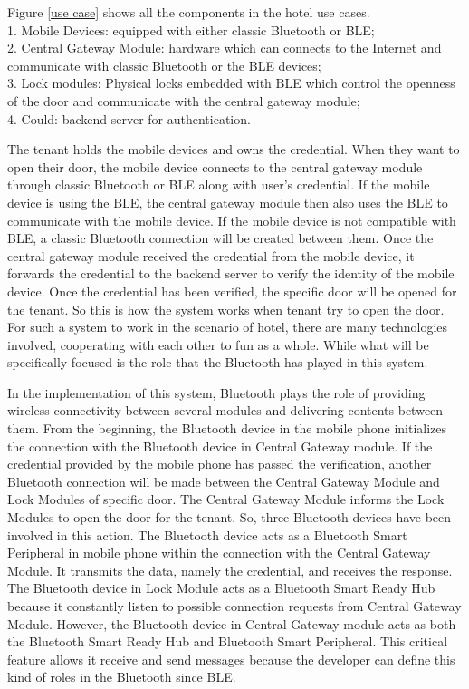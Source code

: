 \documentclass{cseminar}
\begin{document}
Figure \ref{use case} shows all the components in the hotel use cases.
\\1. Mobile Devices: equipped with either classic Bluetooth or BLE;
\\2. Central Gateway Module: hardware which can connects to the Internet and communicate with classic Bluetooth or the BLE devices;
\\3. Lock modules: Physical locks embedded with BLE which control the openness of the door and communicate with the central gateway module;
\\4. Could: backend server for authentication.

The tenant holds the mobile devices and owns the credential. When they want to open their door, the mobile device connects to the central gateway module through classic Bluetooth or BLE along with user's credential. If the mobile device is using the BLE, the central gateway module then also uses the BLE to communicate with the mobile device. If the mobile device is not compatible with BLE, a classic Bluetooth connection will be created between them. Once the central gateway module received the credential from the mobile device, it forwards the credential to the backend server to verify the identity of the mobile device. Once the credential has been verified, the specific door will be opened for the tenant. So this is how the system works when tenant try to open the door. For such a system to work in the scenario of hotel, there are many technologies involved, cooperating with each other to fun as a whole. While what will be specifically focused is the role that the Bluetooth has played in this system.

In the implementation of this system, Bluetooth plays the role of providing wireless connectivity between several modules and delivering contents between them. From the beginning, the Bluetooth device in the mobile phone initializes the connection with the Bluetooth device in Central Gateway module. If the credential provided by the mobile phone has passed the verification, another Bluetooth connection will be made between the Central Gateway Module and Lock Modules of specific door. The Central Gateway Module informs the Lock Modules to open the door for the tenant. So, three Bluetooth devices have been involved in this action. The Bluetooth device acts as a Bluetooth Smart Peripheral in mobile phone within the connection with the Central Gateway Module. It transmits the data, namely the credential, and receives the response. The Bluetooth device in Lock Module acts as a Bluetooth Smart Ready Hub because it constantly listen to possible connection requests from Central Gateway Module. However, the Bluetooth device in Central Gateway module acts as both the Bluetooth Smart Ready Hub and Bluetooth Smart Peripheral. This critical feature allows it receive and send messages because the developer can define this kind of roles in the Bluetooth since BLE.
\end{document}
